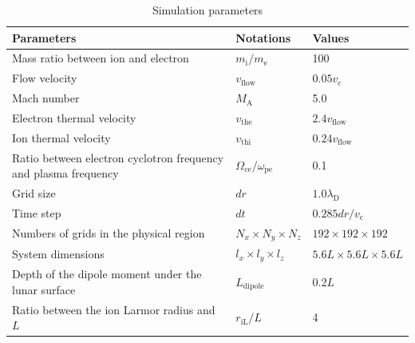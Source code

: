 \documentclass[draft,jgrga]{agutex2015}
\begin{document}
\begin{article}
\begin{table}[h]
\caption{
Simulation parameters
}
\centering
 \begin{tabular}{p{}ll}
 Parameters    &  Notations    &  Values \\  \hline           
 Mass ratio between ion and electron & $m_\mathrm{i}/m_\mathrm{e}$    & 100 \\
 Flow velocity                       & $v_\mathrm{flow} $  &  $0.05v_\mathrm{c}$ \\
 Mach number                         & $M_\mathrm{A}$ & 5.0 \\
 Electron thermal velocity           & $v_\mathrm{the}$ &  $2.4v_\mathrm{flow}$ \\
 Ion thermal velocity                & $v_\mathrm{thi}$ &  $ 0.24v_\mathrm{flow}$ \\
 Ratio between electron cyclotron frequency and plasma frequency & 
  $\Omega_\mathrm{ce}/\omega_\mathrm{pe}$ & 0.1 \\  \hline

 Grid size                          &   $dr$  & $1.0\lambda_\mathrm{D}$  \\
 Time step                          &   $dt$  &  $0.285dr/v_\mathrm{c}$  \\
 Numbers of grids in the physical region  &  
 $N_x \times N_y \times N_z$        &  $192 \times 192 \times 192$  \\
 System dimensions                 &   
$l_x \times l_y \times l_z$ & $ 5.6L \times 5.6L \times 5.6L$  \\
 Depth of the dipole moment under the lunar surface  &   $L_\mathrm{dipole}$ 
 &  0.2$L$ \\  
 Ratio between the ion Larmor radius and $L$ & $ r_\mathrm{iL}/L$  & 4 \\ \hline
 \end{tabular}
\end{table}




\end{article}
\end{document}
